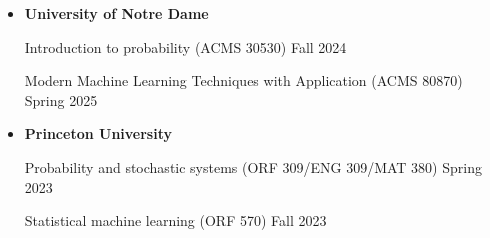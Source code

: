 \documentclass[letterpaper,12pt,oneside]{article}
\theoremstyle{definition}
\begin{document}
			
			\begin{itemize}
				
				\item[] {\bf University of Notre Dame} 
				
				{Introduction to probability} (ACMS 30530) \hfill Fall 2024
				
				{Modern Machine Learning Techniques with Application} (ACMS 80870) \hfill Spring 2025
				
				\item[] {\bf Princeton University} 
				
				{Probability and stochastic systems} (ORF 309/ENG 309/MAT 380) \hfill Spring 2023
				
				{Statistical machine learning} (ORF 570)  \hfill Fall 2023\\
			\end{itemize}
			
%				
%				
			
\end{document}
